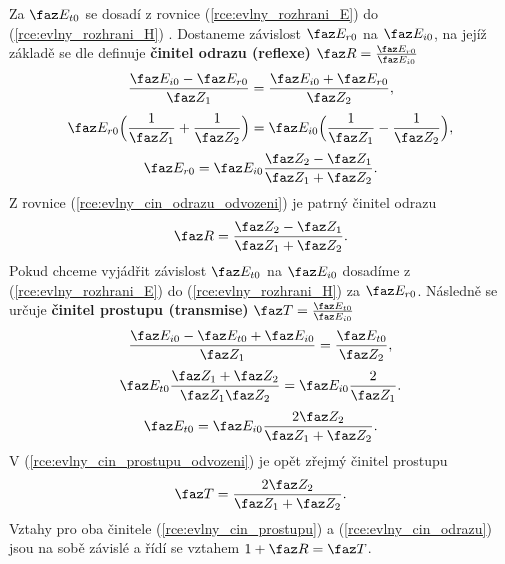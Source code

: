 Za $\faz E_{t0}$ se dosadí z rovnice (\ref{rce:evlny_rozhrani_E}) do (\ref{rce:evlny_rozhrani_H}) . Dostaneme závislost $\faz E_{r0}$ na $\faz E_{i0}$, na jejíž základě se dle \cite{emp} definuje {\bf činitel odrazu (reflexe)}  $\faz R = \frac{\faz E_{r0}}{\faz E_{i0}}$
\begin{displaymath}
	\frac{\faz E_{i0}-\faz E_{r0}}{\faz Z_{1}} = \frac{\faz E_{i0} + \faz E_{r0}}{\faz Z_{2}},
\end{displaymath}
\begin{displaymath}
	\faz E_{r0}\Big( \frac{1}{\faz Z_{1}} + \frac{1}{\faz Z_{2}} \Big) = \faz E_{i0}\Big( \frac{1}{\faz Z_{1}} - \frac{1}{\faz Z_{2}} \Big),
\end{displaymath}
\begin{equation}
	\faz E_{r0} = \faz E_{i0} \frac{\faz Z_{2}-\faz Z_{1}}{\faz Z_{1}+\faz Z_{2}}.
	\label{rce:evlny_cin_odrazu_odvozeni}
\end{equation}
Z rovnice (\ref{rce:evlny_cin_odrazu_odvozeni}) je patrný činitel odrazu
\begin{equation}
	\faz R = \frac{\faz Z_{2}-\faz Z_{1}}{\faz Z_{1}+\faz Z_{2}}.
	\label{rce:evlny_cin_odrazu}
\end{equation}
 Pokud chceme vyjádřit závislost $\faz E_{t0}$ na $\faz E_{i0}$ dosadíme z (\ref{rce:evlny_rozhrani_E}) do (\ref{rce:evlny_rozhrani_H}) za $\faz E_{r0}$. Následně se určuje {\bf činitel prostupu (transmise)}  $\faz T = \frac{\faz E_{t0}}{\faz E_{i0}}$ 
\begin{displaymath}
	\frac{\faz E_{i0}-\faz E_{t0}+\faz E_{i0}}{\faz Z_{1}} = \frac{\faz E_{t0}}{\faz Z_{2}},
\end{displaymath}
\begin{displaymath}
	\faz E_{t0} \frac{\faz Z_{1}+\faz Z_{2}}{\faz Z_{1}\faz Z_{2}} = \faz E_{i0} \frac{2}{\faz Z_{1}}.
\end{displaymath}
\begin{equation}
	\faz E_{t0} = \faz E_{i0} \frac{2\faz Z_{2}}{\faz Z_{1}+\faz Z_{2}}.
	\label{rce:evlny_cin_prostupu_odvozeni}
\end{equation}
V (\ref{rce:evlny_cin_prostupu_odvozeni}) je opět zřejmý činitel prostupu
\begin{equation}
	\faz T = \frac{2\faz Z_{2}}{\faz Z_{1}+\faz Z_{2}}.
	\label{rce:evlny_cin_prostupu}
\end{equation}
Vztahy pro oba činitele (\ref{rce:evlny_cin_prostupu}) a (\ref{rce:evlny_cin_odrazu}) jsou na sobě závislé a řídí se vztahem $1 + \faz R = \faz T$.

